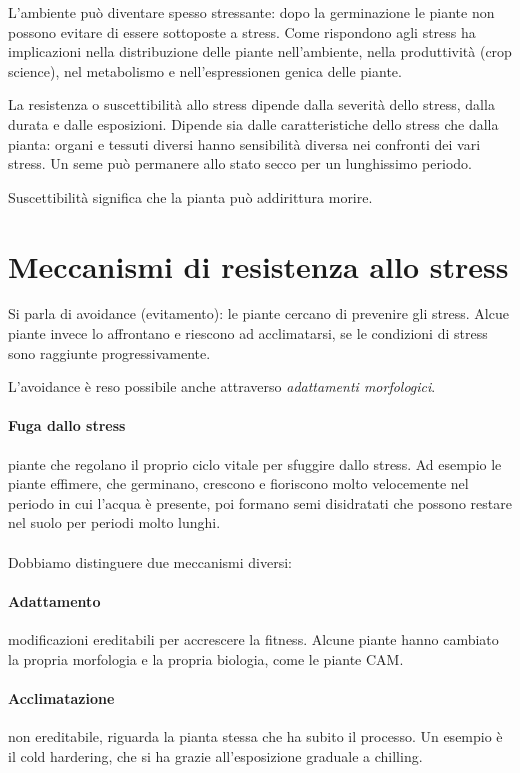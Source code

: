 \documentclass[a4paper,12pt]{book}
\begin{document}
L'ambiente può diventare spesso stressante: dopo la germinazione le piante non possono evitare di essere sottoposte a stress. Come rispondono agli stress ha implicazioni nella distribuzione delle piante nell'ambiente, nella produttività (crop science), nel metabolismo e nell'espressionen genica delle piante.

La resistenza o suscettibilità allo stress dipende dalla severità dello stress, dalla durata e dalle esposizioni. Dipende sia dalle caratteristiche dello stress che dalla pianta: organi e tessuti diversi hanno sensibilità diversa nei confronti dei vari stress. Un seme può permanere allo stato secco per un lunghissimo periodo.

Suscettibilità significa che la pianta può addirittura morire.

\section{Meccanismi di resistenza allo stress}
Si parla di avoidance (evitamento): le piante cercano di prevenire gli stress. Alcue piante invece lo affrontano e riescono ad acclimatarsi, se le condizioni di stress sono raggiunte progressivamente.

L'avoidance è reso possibile anche attraverso \emph{adattamenti morfologici}.

\paragraph{Fuga dallo stress} piante che regolano il proprio ciclo vitale per sfuggire dallo stress. Ad esempio le piante effimere, che germinano, crescono e fioriscono molto velocemente nel periodo in cui l'acqua è presente, poi formano semi disidratati che possono restare nel suolo per periodi molto lunghi.
\paragraph{}

Dobbiamo distinguere due meccanismi diversi:
\paragraph{Adattamento} modificazioni ereditabili per accrescere la fitness. Alcune piante hanno cambiato la propria morfologia e la propria biologia, come le piante CAM.

\paragraph{Acclimatazione} non ereditabile, riguarda la pianta stessa che ha subito il processo. Un esempio è il cold hardering, che si ha grazie all'esposizione graduale a chilling.
\end{document}
